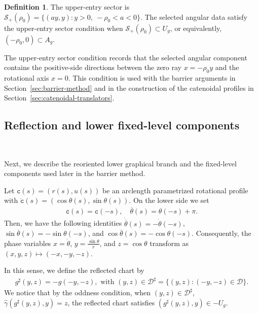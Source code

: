 \documentclass{amsart}
\theoremstyle{plain}
\theoremstyle{mainintrothm}
\theoremstyle{definition}
\newtheorem{definition}[theorem]{Definition}
\begin{document}
	\begin{definition}
		\label{def:upper-entry-sector-condition}
		The upper-entry sector is $\mathcal S_+(\rho_0)=\{(ay,y):y>0,\ -\rho_0<a<0\}$.
		The selected angular data satisfy the upper-entry sector condition when
		$\mathcal S_+(\rho_0)\subset U_g$, or equivalently, $(-\rho_0,0)\subset A_g$.
	\end{definition}

	The upper-entry sector condition records that the selected angular component
	contains the positive-side directions between the zero ray $x=-\rho_0y$ and the
	rotational axis $x=0$.  This condition is used with the barrier arguments in
	Section~\ref{sec:barrier-method} and in the construction of the catenoidal
	profiles in Section~\ref{sec:catenoidal-translators}.


	\subsection{Reflection and lower fixed-level components}\,
	\label{subsec:reflected-lower-components}

	Next, we describe the reoriented lower graphical branch and the fixed-level
	components used later in the barrier method.  
	\medskip

	Let $\mathtt c(s)=(r(s),u(s))$ be an arclength parametrized rotational profile
	with $\dot{\mathtt c}(s)=(\cos\theta(s),\sin\theta(s))$.  On the lower side we
	set
	\begin{align*}
		\overline{\mathtt c}(s)=\mathtt c(-s),
		\quad
		\overline\theta(s)=\theta(-s)+\pi .
	\end{align*}
	Then, we have the following identities $\dot{\overline\theta}(s)=-\dot\theta(-s)$,
	$\sin\overline\theta(s)=-\sin\theta(-s)$, and
	$\cos\overline\theta(s)=-\cos\theta(-s)$.  Consequently, the phase variables
	$x=\dot\theta$, $y=\frac{\sin\theta}{r}$, and $z=\cos\theta$ transform as
	$(x,y,z)\mapsto(-x,-y,-z)$.

	\medskip

	In this sense, we  define the reflected chart by
	\begin{align*}
		g^\sharp(y,z)
		=
		-g(-y,-z),
		\mbox{ with }(y,z)\in
		\mathcal D^\sharp
		=
		\{(y,z):(-y,-z)\in\mathcal D\}.
	\end{align*}
	We notice that by the oddness condition, when $(y,z)\in\mathcal D^\sharp$,
	$\widehat\gamma(g^\sharp(y,z),y)=z$, the reflected chart satisfies
	$(g^\sharp(y,z),y)\in -U_g$.  
\end{document}
